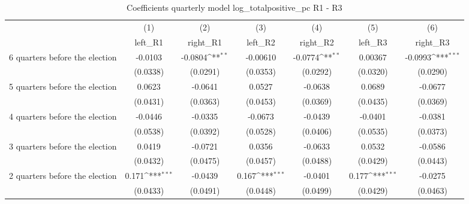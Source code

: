 \begin{table}[htbp]\centering
\def\sym#1{\ifmmode^{#1}\else\(^{#1}\)\fi}
\caption{Coefficients quarterly model log\_totalpositive\_pc R1 - R3}
\begin{tabular}{l*{6}{c}}
\hline\hline
                    &\multicolumn{1}{c}{(1)}&\multicolumn{1}{c}{(2)}&\multicolumn{1}{c}{(3)}&\multicolumn{1}{c}{(4)}&\multicolumn{1}{c}{(5)}&\multicolumn{1}{c}{(6)}\\
                    &\multicolumn{1}{c}{left\_R1}&\multicolumn{1}{c}{right\_R1}&\multicolumn{1}{c}{left\_R2}&\multicolumn{1}{c}{right\_R2}&\multicolumn{1}{c}{left\_R3}&\multicolumn{1}{c}{right\_R3}\\
\hline
 6 quarters before the election&     -0.0103         &     -0.0804\sym{**} &    -0.00610         &     -0.0774\sym{**} &     0.00367         &     -0.0993\sym{***}\\
                    &    (0.0338)         &    (0.0291)         &    (0.0353)         &    (0.0292)         &    (0.0320)         &    (0.0290)         \\
[1em]
 5 quarters before the election&      0.0623         &     -0.0641         &      0.0527         &     -0.0638         &      0.0689         &     -0.0677         \\
                    &    (0.0431)         &    (0.0363)         &    (0.0453)         &    (0.0369)         &    (0.0435)         &    (0.0369)         \\
[1em]
 4 quarters before the election&     -0.0446         &     -0.0335         &     -0.0673         &     -0.0439         &     -0.0401         &     -0.0381         \\
                    &    (0.0538)         &    (0.0392)         &    (0.0528)         &    (0.0406)         &    (0.0535)         &    (0.0373)         \\
[1em]
 3 quarters before the election&      0.0419         &     -0.0721         &      0.0356         &     -0.0633         &      0.0532         &     -0.0586         \\
                    &    (0.0432)         &    (0.0475)         &    (0.0457)         &    (0.0488)         &    (0.0429)         &    (0.0443)         \\
[1em]
 2 quarters before the election&       0.171\sym{***}&     -0.0439         &       0.167\sym{***}&     -0.0401         &       0.177\sym{***}&     -0.0275         \\
                    &    (0.0433)         &    (0.0491)         &    (0.0448)         &    (0.0499)         &    (0.0429)         &    (0.0463)         \\

\end{tabular}
\end{table}
